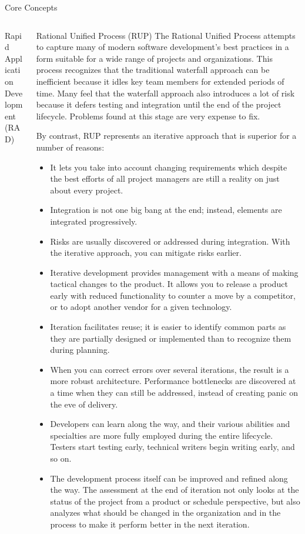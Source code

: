 \documentclass[final,hyperref={pdfpagelabels=false}]{beamer}
\begin{document}
\begin{frame}{Core Concepts}
\begin{columns}[t]
\begin{column}{.48\linewidth}
\begin{block}{Rapid Application Development (RAD)}
        \end{block}
      \end{column}
      \begin{column}{.48\linewidth}
        \begin{block}{Rational Unified Process (RUP) }
            The Rational Unified Process attempts to capture many of modern software development's best practices in a form suitable for a wide range of projects and organizations. This process recognizes that the traditional waterfall approach can be inefficient because it idles key team members for extended periods of time. Many feel that the waterfall approach also introduces a lot of risk because it defers testing and integration until the end of the project lifecycle. Problems found at this stage are very expense to fix.
 
            By contrast, RUP represents an iterative approach that is superior for a number of reasons:
            \begin{itemize}
                \item It lets you take into account changing requirements which despite the best efforts of all project managers are still a reality on just about every project.
                \item Integration is not one big bang at the end; instead, elements are integrated progressively.
                \item Risks are usually discovered or addressed during integration. With the iterative approach, you can mitigate risks earlier.
                \item Iterative development provides management with a means of making tactical changes to the product. It allows you to release a product early with reduced functionality to counter a move by a competitor, or to adopt another vendor for a given technology.
                \item Iteration facilitates reuse; it is easier to identify common parts as they are partially designed or implemented than to recognize them during planning.
                \item When you can correct errors over several iterations, the result is a more robust architecture. Performance bottlenecks are discovered at a time when they can still be addressed, instead of creating panic on the eve of delivery.
                \item Developers can learn along the way, and their various abilities and specialties are more fully employed during the entire lifecycle. Testers start testing early, technical writers begin writing early, and so on.
                \item The development process itself can be improved and refined along the way. The assessment at the end of iteration not only looks at the status of the project from a product or schedule perspective, but also analyzes what should be changed in the organization and in the process to make it perform better in the next iteration.
 

\end{itemize}
\end{block}
\end{column}
\end{columns}
\end{frame}
\end{document}
